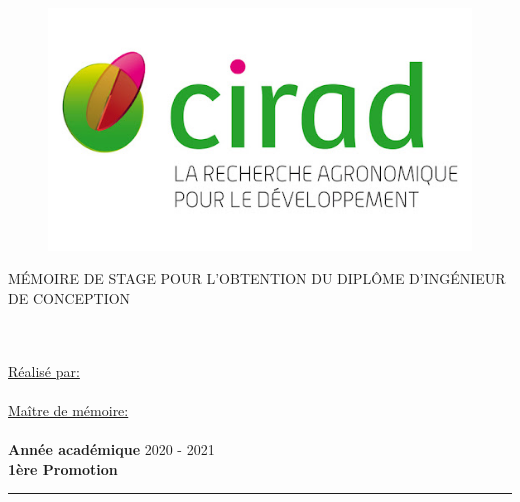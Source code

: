 \begin{titlepage}
\begin{center}
\begin{figure}[!htb]
\begin{minipage}{0.50\textwidth}
				
			\end{minipage}
			\hfill
			\begin{minipage}{0.22\textwidth}%
				\includegraphics[width=\linewidth]{Figures/cirad}
			\end{minipage}
		\end{figure}
		{\scshape\LARGE \univname\par}\vspace{1cm} %
		{\scshape\large MÉMOIRE DE STAGE POUR L’OBTENTION DU DIPLÔME D’INGÉNIEUR DE CONCEPTION}\\[0.2cm] %
		
		\HRule \\[0.4cm] %
		{\Large \bfseries \ttitle\par}\vspace{0.2cm} %
		\HRule \\[1.5cm] %
		
		\large \underline{Réalisé par:}\\[0.3cm]{\textbf{\Large \authorname}} \\
		\vspace{0.5cm}
		\large \underline{Maître de mémoire:} \\[0.3cm]{\textbf{\Large \supname}} %
		\\[2cm]
		
		\textbf{\Large Année académique} 2020 - 2021\\[0.4cm]
		\vfill
		\textbf{\Large 1ère Promotion}\\[0.7cm]
		\hrule height 0.1cm %
		
	\end{center}
\end{titlepage}